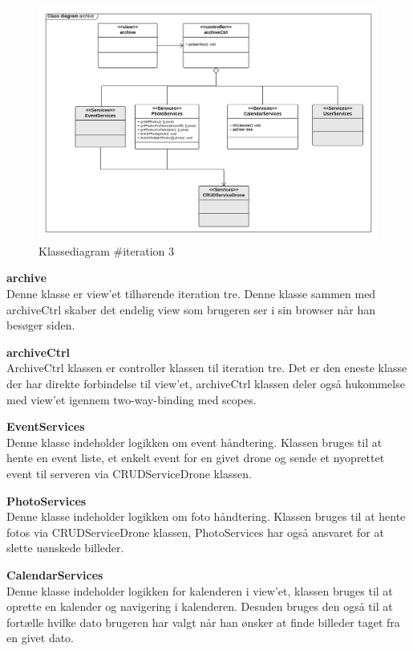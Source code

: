 \begin{figure}[H]
	\centering
	\includegraphics[width=1\textwidth]{Billeder/klasse_diagrammer/classdiagram_iteration3_server.png}
	\vspace{-0.5cm}
	\caption{Klassediagram \#iteration 3}
	\label{fig:classDiagram_iteration3}
\end{figure}

\textbf{archive}\\
Denne klasse er view'et tilhørende iteration tre. Denne klasse sammen med archiveCtrl skaber det endelig view som brugeren ser i sin browser når han besøger siden.

\textbf{archiveCtrl}\\
ArchiveCtrl klassen er controller klassen til iteration tre. Det er den eneste klasse der har direkte forbindelse til view'et, archiveCtrl klassen deler også hukommelse med view'et igennem two-way-binding med scopes.

\textbf{EventServices}\\
Denne klasse indeholder logikken om event håndtering. Klassen bruges til at hente en event liste, et enkelt event for en givet drone og sende et nyoprettet event til serveren via CRUDServiceDrone klassen.

\textbf{PhotoServices}\\
Denne klasse indeholder logikken om foto håndtering. Klassen bruges til at hente fotos via CRUDServiceDrone klassen, PhotoServices har også ansvaret for at slette uønskede billeder.

\textbf{CalendarServices}\\
Denne klasse indeholder logikken for kalenderen i view'et, klassen bruges til at oprette en kalender og navigering i kalenderen. Desuden bruges den også til at fortælle hvilke dato brugeren har valgt når han ønsker at finde billeder taget fra en givet dato.

